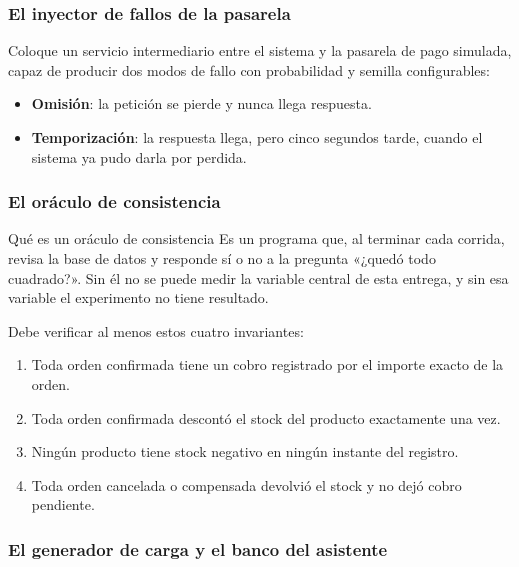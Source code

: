 \documentclass[11pt,a4paper]{article}
\begin{document}
	\subsubsection{El inyector de fallos de la pasarela}
	
	Coloque un servicio intermediario entre el sistema y la pasarela de pago simulada, capaz de producir dos modos de fallo con probabilidad y semilla configurables:
	
	\begin{itemize}[leftmargin=*,itemsep=3pt]
		\item \textbf{Omisión}: la petición se pierde y nunca llega respuesta.
		\item \textbf{Temporización}: la respuesta llega, pero cinco segundos tarde, cuando el sistema ya pudo darla por perdida.
	\end{itemize}
	
	\subsubsection{El oráculo de consistencia}
	
	\begin{defBox}{Qué es un oráculo de consistencia}
		Es un programa que, al terminar cada corrida, revisa la base de datos y responde sí o no a la pregunta «¿quedó todo cuadrado?». Sin él no se puede medir la variable central de esta entrega, y sin esa variable el experimento no tiene resultado.
	\end{defBox}
	
	Debe verificar al menos estos cuatro invariantes:
	
	\begin{enumerate}[leftmargin=*,itemsep=2pt]
		\item Toda orden confirmada tiene un cobro registrado por el importe exacto de la orden.
		\item Toda orden confirmada descontó el stock del producto exactamente una vez.
		\item Ningún producto tiene stock negativo en ningún instante del registro.
		\item Toda orden cancelada o compensada devolvió el stock y no dejó cobro pendiente.
	\end{enumerate}
	
	\subsubsection{El generador de carga y el banco del asistente}
	
\end{document}
